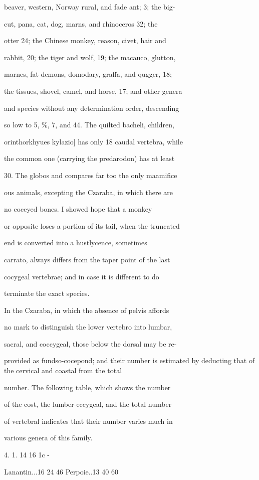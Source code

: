 \documentclass{article}
\begin{document}
beaver, western, Norway rural, and fade ant; 3; the big-

cut, pana, cat, dog, marns, and rhinoceros 32; the

otter 24; the Chinese monkey, reason, civet, hair and

rabbit, 20; the tiger and wolf, 19; the macauco, glutton,

marnes, fat demons, domodary, graffa, and qugger, 18;

the tissues, shovel, camel, and horse, 17; and other genera

and species without any determination order, descending

so low to 5, \%, 7, and 44. The quilted bacheli, children,

orinthorkhyues kylazio] has only 18 caudal vertebra, while

the common one (carrying the predarodon) has at least

30. The globos and compares far too the only maamifice

ous animals, excepting the Czaraba, in which there are

no coceyed bones. I showed hope that a monkey

or opposite loses a portion of its tail, when the truncated

end is converted into a hustlycence, sometimes

carrato, always differs from the taper point of the last

cocygeal vertebrae; and in case it is different to do

terminate the exact species.

In the Czaraba, in which the absence of pelvis affords

no mark to distinguish the lower vertebro into lumbar,

sacral, and coccygeal, those below the dorsal may be re-

provided as fundso-cocepond; and their number is estimated by deducting that of the cervical and coastal from the total

number. The following table, which shows the number

of the cost, the lumber-eccygeal, and the total number

of vertebral indicates that their number varies much in

various genera of this family.

4. 1. 14 16 1c -

Lanantin...16 24 46 Perpoie..13 40 60
\end{document}
